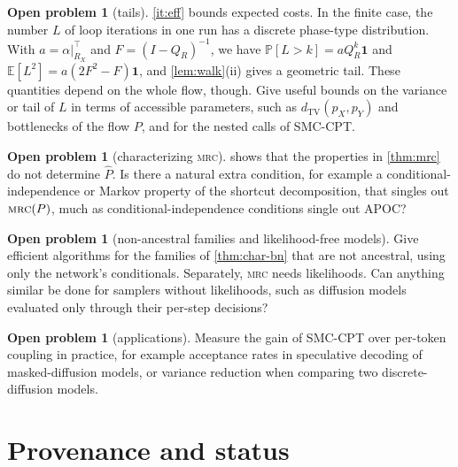\documentclass[11pt]{article}
\theoremstyle{definition}
\newtheorem{openproblem}[theorem]{Open problem}
\newcommand{\pX}{p_X}
\newcommand{\pY}{p_Y}
\newcommand{\hP}{\hat P}
\newcommand{\TV}{d_{\mathrm{TV}}}
\newcommand{\one}{\mathbf{1}}
\newcommand{\MRC}{\textnormal{\textsc{mrc}}}
\renewcommand{\Pr}{\mathbb{P}}
\newcommand{\Ex}{\mathbb{E}}
\begin{document}
\begin{openproblem}[tails]
\ref{it:eff} bounds expected costs. In the finite case, the
number $L$ of loop iterations in one run has a discrete phase-type
distribution. With $a=\alpha|_{R_X}^\top$ and $F=(I-Q_R)^{-1}$, we have
$\Pr[L>k]=aQ_R^k\one$ and $\Ex[L^2]=a(2F^2-F)\one$, and \cref{lem:walk}(ii)
gives a geometric tail. These quantities depend on the whole flow, though. Give
useful bounds on the variance or tail of $L$ in terms of accessible parameters,
such as $\TV(\pX,\pY)$ and bottlenecks of the flow $P$, and for the nested
calls of SMC-CPT.
\end{openproblem}

\begin{openproblem}[characterizing \MRC]
 shows that the properties in \cref{thm:mrc} do not
determine $\hP$. Is there a natural extra condition, for example a
conditional-independence or Markov property of the shortcut decomposition, that
singles out $\MRC(P)$, much as conditional-independence conditions single out
APOC?
\end{openproblem}

\begin{openproblem}[non-ancestral families and likelihood-free models]
Give efficient algorithms for the families of \cref{thm:char-bn} that are not
ancestral, using only the network's conditionals. Separately, \MRC{} needs
likelihoods. Can anything similar be done for samplers without likelihoods,
such as diffusion models evaluated only through their per-step decisions?
\end{openproblem}

\begin{openproblem}[applications]
Measure the gain of SMC-CPT over per-token coupling in practice, for example
acceptance rates in speculative decoding of masked-diffusion models, or
variance reduction when comparing two discrete-diffusion models.
\end{openproblem}

\section{Provenance and status}\label{sec:provenance}
\end{document}
